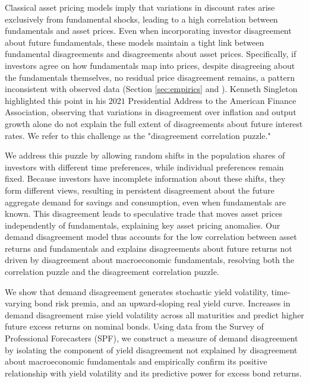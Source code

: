 \documentclass[preprint,11pt,authoryear]{elsarticle}
\theoremstyle{plain}
\begin{document}
Classical asset pricing models imply that variations in discount rates arise exclusively from fundamental shocks, leading to a high correlation between fundamentals and asset prices.  Even when incorporating investor disagreement about future fundamentals, these models maintain a tight link between fundamental disagreements and disagreements about asset prices. Specifically, if investors agree on how fundamentals map into prices, despite disagreeing about the fundamentals themselves, no residual price disagreement remains, a pattern inconsistent with observed data (Section \ref{sec:empirics} and \cite{GiacolettiLaursenSingleton2021}). Kenneth Singleton highlighted this point in his $2021$ Presidential Address to the American Finance Association, observing that variations in disagreement over inflation and output growth alone do not explain the full extent of disagreements about future interest rates. We refer to this challenge as the "disagreement correlation puzzle."  

We address this puzzle by allowing random shifts in the population shares of investors with different time preferences, while individual preferences remain fixed. Because investors have incomplete information about these shifts, they form different views, resulting in persistent disagreement about the future aggregate demand for savings and consumption, even when fundamentals are known. This disagreement leads to speculative trade that moves asset prices independently of fundamentals, explaining key asset pricing anomalies. Our demand disagreement model thus accounts for the low correlation between asset returns and fundamentals and explains disagreements about future returns not driven by disagreement about macroeconomic fundamentals, resolving both the correlation puzzle and the disagreement correlation puzzle. 


We show that demand disagreement generates stochastic yield volatility, time-varying bond risk premia, and an upward-sloping real yield curve. Increases in demand disagreement raise yield volatility across all maturities and predict higher future excess returns on nominal bonds. Using data from the Survey of Professional Forecasters (SPF), we construct a measure of demand disagreement by isolating the component of yield disagreement not explained by disagreement about macroeconomic fundamentals and empirically confirm its positive relationship with yield volatility and its predictive power for excess bond returns.  
\end{document}
